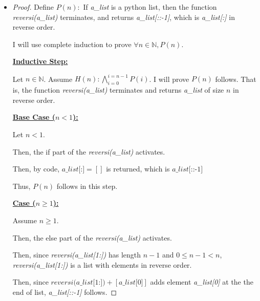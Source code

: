 \documentclass[12pt]{article}
\begin{document}
\begin{itemize}
    \item

    \begin{proof}

    Define $P(n):$ If \textit{a\_list} is a python list, then the function
    \textit{reversi(a\_list)} terminates, and returns \textit{a\_list[::-1]},
    which is \textit{a\_list[:]} in reverse order.

    \bigskip

    I will use complete induction to prove $\forall n \in \mathbb{N}, P(n)$.

    \bigskip

    \underline{\textbf{Inductive Step:}}

    \bigskip

    Let $n \in \mathbb{N}$. Assume $H(n): \bigwedge\limits_{i=0}^{i=n-1} P(i)$.
    I will prove $P(n)$ follows. That is, the function \textit{reversi(a\_list)} terminates
    and returns \textit{a\_list} of size $n$ in reverse order.

    \bigskip

    \underline{\textbf{Base Case ($n < 1$):}}

    \bigskip

    Let $n < 1$.

    \bigskip

    Then, the if part of the \textit{reversi(a\_list)} activates.

    \bigskip

    Then, by code, $\textit{a\_list[:]} = []$ is returned, which is $\textit{a\_list[::-1]}$

    \bigskip

    Thus, $P(n)$ follows in this step.

    \bigskip

    \underline{\textbf{Case ($n \geq 1$):}}

    \bigskip

    Assume $n \geq 1$.

    \bigskip

    Then, the else part of the \textit{reversi(a\_list)} activates.

    \bigskip

    Then, since \textit{reversi(a\_list[1:])} has length $n-1$ and $0 \leq n -1 < n$,
    \textit{reversi(a\_list[1:])} is a list with elements in reverse order.

    \bigskip

    Then, since $\textit{reversi(a\_list[1:])} + [\textit{a\_list[0]}]$
    adds element \textit{a\_list[0]} at the the end of list, \textit{a\_list[::-1]} follows.


\end{proof}
\end{itemize}
\end{document}
